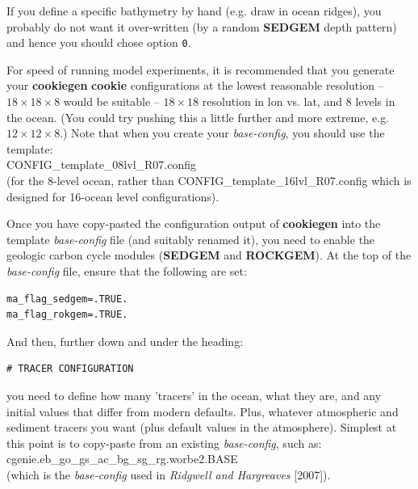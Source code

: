 If you define a specific bathymetry by hand (e.g. draw in ocean ridges), you probably do not want it over-written (by a random \textbf{SEDGEM} depth pattern) and hence you should chose option \texttt{0}.

For speed of running model experiments, it is recommended that you generate your \textbf{cookiegen} \textbf{cookie} configurations at the lowest reasonable resolution -- \(18\times18\times8\) would be suitable -- \(18\times18\) resolution in lon vs. lat, and \(8\) levels in the ocean. (You could try pushing this a little further and more extreme, e.g. \(12\times12\times8\).) Note that when you create your \textit{base-config}, you should use the template:
\vspace{1mm}
\\\textsf{\footnotesize CONFIG\_template\_08lvl\_R07.config}
\vspace{1mm}
\\(for the 8-level ocean, rather than \textsf{\footnotesize CONFIG\_template\_16lvl\_R07.config } which is designed for 16-ocean level configurations).

Once you have copy-pasted the configuration output of \textbf{cookiegen} into the template \textit{base-config} file (and suitably renamed it), you need to enable the geologic carbon cycle modules (\textbf{SEDGEM} and \textbf{ROCKGEM}). At the top of the \textit{base-config} file, ensure that the following are set:
\vspace{-1mm}\small\begin{verbatim}
ma_flag_sedgem=.TRUE.
ma_flag_rokgem=.TRUE.
\end{verbatim}\normalsize\vspace{-1mm}
And then, further down and under the heading:
\vspace{-1mm}\small\begin{verbatim}
# TRACER CONFIGURATION
\end{verbatim}\normalsize\vspace{-1mm}
you need to define how many 'tracers' in the ocean, what they are, and any initial values that differ from modern defaults. Plus, whatever atmospheric and sediment tracers you want (plus default values in the atmosphere). Simplest at this point is to copy-paste from an existing \textit{base-config}, such as:
\vspace{1mm}
\\\textsf{\footnotesize cgenie.eb\_go\_gs\_ac\_bg\_sg\_rg.worbe2.BASE}
\vspace{1mm}
\\(which is the \textit{base-config} used in \textit{Ridgwell and Hargreaves} [2007]).

